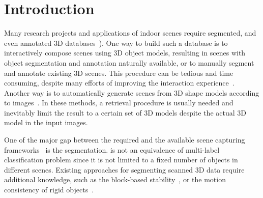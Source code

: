 \section{Introduction}
\label{sec:intro}

Many research projects and applications of indoor scenes require segmented, and even annotated 3D databases~\cite{SearchClassify,SceneFromExample,Fisher:2012:ESO:2366145.2366154,Chen:2014:ASM:2661229.2661239,Fisher:ActivityCentricSceneSynthesis}).
%
One way to build such a database is to interactively compose scenes using 3D object models, resulting in scenes with object segmentation and annotation naturally available, or to manually segment and annotate existing 3D scenes. 
%
This procedure can be tedious and time consuming, despite many efforts of improving the interaction experience~\cite{Merrell:2011:IFL:2010324.1964982, Xu:2013:SSC:2461912.2461968}.
%
Another way is to automatically generate scenes from 3D shape models according to images~\cite{Liu2015Model,Chen:2014:ASM:2661229.2661239}. 
%
In these methods, a retrieval procedure is usually needed and inevitably limit the result to a certain set of 3D models despite the actual 3D model in the input images.



%
One of the major gap between the required  and the available scene capturing frameworks~\cite{KinectFusion, dai2016bundlefusion}  is the  segmentation. 
%
 is not an equivalence of multi-label classification problem since it is not limited to a fixed number of objects in different scenes. 
%
Existing approaches for segmenting scanned 3D data require additional knowledge, such as the block-based stability~\cite{3DReasoningfromBlockstoStability}, or the motion consistency of rigid objects~\cite{Xu:2015:ACS:2816795.2818075}.  
%
%

